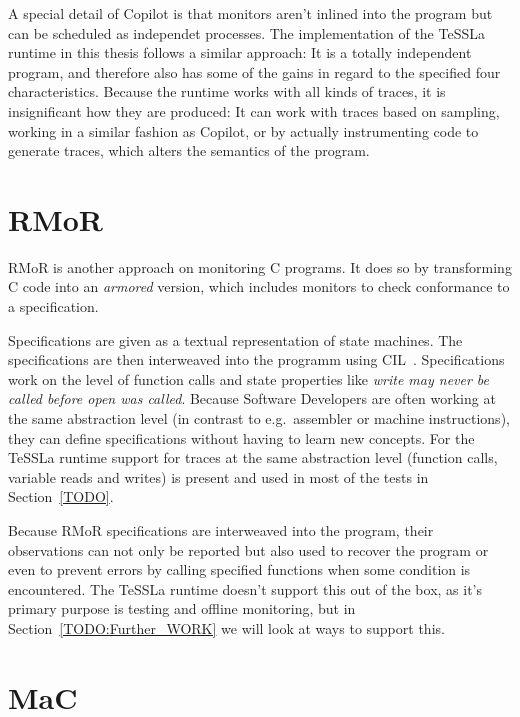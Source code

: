 A special detail of Copilot is that monitors aren't inlined into the program but can be scheduled as independet processes.
The implementation of the TeSSLa runtime in this thesis follows a similar approach: It is a totally independent program,
and therefore also has some of the gains in regard to the specified four characteristics.
Because the runtime works with all kinds of traces, it is insignificant how they are produced:
It can work with traces based on sampling, working in a similar fashion as Copilot, or by actually instrumenting code to generate
traces, which alters the semantics of the program.


\section{RMoR}
\label{sec:related:rmor}

RMoR is another approach on monitoring C programs.
It does so by transforming C code into an \emph{armored} version, which includes monitors to check conformance to a specification.

Specifications are given as a textual representation of state machines.
The specifications are then interweaved into the programm using CIL~\cite{Necula2002}.
Specifications work on the level of function calls and state properties like \emph{write may never be called before open was called}.
Because Software Developers are often working at the same abstraction level (in contrast to e.g.\ assembler or machine instructions), they can define specifications without having to learn new concepts.
For the TeSSLa runtime support for traces at the same abstraction level (function calls, variable reads and writes) is present and used in most of the tests in Section~\ref{TODO}.

Because RMoR specifications are interweaved into the program, their observations can not only be reported but also used to recover the program or even to prevent errors by calling specified functions when some condition is encountered.
The TeSSLa runtime doesn't support this out of the box, as it's primary purpose is testing and offline monitoring, but in Section~\ref{TODO:Further_WORK} we will look at ways to support this.

\section{MaC}
